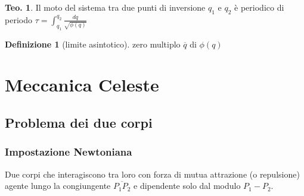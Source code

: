 \documentclass[a4paper,10pt]{article}
\theoremstyle{definition}
\theoremstyle{indentdefinition}
\newtheorem{defn}{Definizione}[section]
\theoremstyle{indenttheorem}
\newtheorem{thm}{Teo.}
\theoremstyle{myremark}
\theoremstyle{indentgeneral}
\begin{document}
\begin{thm}
Il moto del sistema tra due punti di inversione $q_{1}$ e $q_{2}$
è periodico di periodo $\tau=\int_{q_{1}}^{q_{2}}\frac{dq}{\sqrt{\phi\left(q\right)}}$
\end{thm}

\begin{defn}[limite asintotico]
zero multiplo $\overline{q}$ di $\phi\left(q\right)$
\end{defn}

\pagebreak{}

\section{Meccanica Celeste}

\subsection{Problema dei due corpi}

\subsubsection{Impostazione Newtoniana}
Due corpi che interagiscono tra loro con forza di mutua attrazione (o repulsione) agente lungo la congiungente $\overline{P_1P_2}$ e dipendente solo dal modulo $P_1-P_2$.
\end{document}

